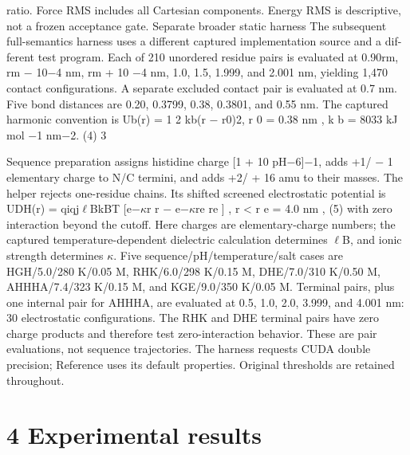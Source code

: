 \documentclass[11pt]{article}
\begin{document}
ratio. Force RMS includes all Cartesian components. Energy RMS is descriptive, not a frozen
acceptance gate.
Separate broader static harness
The subsequent full-semantics harness uses a different captured implementation source and a dif-
ferent test program. Each of 210 unordered residue pairs is evaluated at 0.90rm, rm \ensuremath{-} 10\ensuremath{-}4 nm,
rm + 10 \ensuremath{-}4 nm, 1.0, 1.5, 1.999, and 2.001 nm, yielding 1,470 contact configurations. A separate
excluded contact pair is evaluated at 0.7 nm. Five bond distances are 0.20, 0.3799, 0.38, 0.3801,
and 0.55 nm.
The captured harmonic convention is
Ub(r) = 1
2 kb(r \ensuremath{-} r0)2, r 0 = 0.38 nm , k b = 8033 kJ mol \ensuremath{-}1 nm\ensuremath{-}2. (4)
3

Sequence preparation assigns histidine charge [1 + 10 pH\ensuremath{-}6]\ensuremath{-}1, adds +1/ \ensuremath{-} 1 elementary charge to
N/C termini, and adds +2/ + 16 amu to their masses. The helper rejects one-residue chains. Its
shifted screened electrostatic potential is
UDH(r) = qiqj\ensuremath{\ell}BkBT
[e\ensuremath{-}\ensuremath{\kappa}r
r \ensuremath{-} e\ensuremath{-}\ensuremath{\kappa}re
re
]
, r < r e = 4.0 nm , (5)
with zero interaction beyond the cutoff. Here charges are elementary-charge numbers; the captured
temperature-dependent dielectric calculation determines \ensuremath{\ell}B, and ionic strength determines \ensuremath{\kappa}.
Five sequence/pH/temperature/salt cases are HGH/5.0/280 K/0.05 M, RHK/6.0/298 K/0.15
M, DHE/7.0/310 K/0.50 M, AHHHA/7.4/323 K/0.15 M, and KGE/9.0/350 K/0.05 M. Terminal
pairs, plus one internal pair for AHHHA, are evaluated at 0.5, 1.0, 2.0, 3.999, and 4.001 nm: 30
electrostatic configurations. The RHK and DHE terminal pairs have zero charge products and
therefore test zero-interaction behavior. These are pair evaluations, not sequence trajectories. The
harness requests CUDA double precision; Reference uses its default properties. Original thresholds
are retained throughout.

\section*{4 Experimental results}
\end{document}
